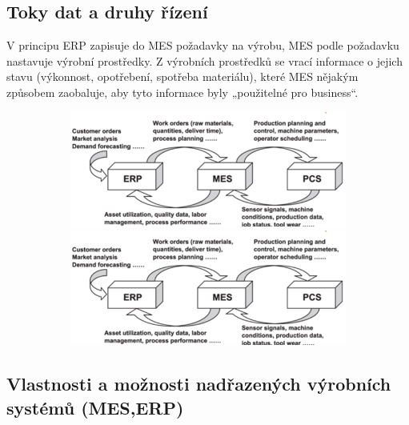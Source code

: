 \subsection{Toky dat a druhy řízení}
V principu ERP zapisuje do MES požadavky na výrobu, MES podle požadavku nastavuje výrobní prostředky. Z výrobních prostředků se vrací informace o jejich stavu (výkonnost, opotřebení, spotřeba materiálu), které MES nějakým způsobem zaobaluje, aby tyto informace byly „použitelné pro business“.

  \begin{figure}[h]
\begin{figure}[h]
    \begin{center}
      \includegraphics[scale = 1]{img/picture3.png}
        \includegraphics[scale = 1]{img/picture3.png}
    \end{center}
  \end{figure}
\end{figure}


  \subsection{Vlastnosti a možnosti nadřazených výrobních systémů (MES,ERP)}
